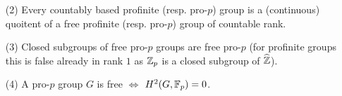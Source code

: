 \documentclass[12pt]{amsart}
\begin{document}
\begin{itemize}
\item[(2)] Every countably based profinite (resp. pro-$p$) group is a (continuous) quoitent of a free profinite (resp. pro-$p$) group
of countable rank.
\item[(3)] Closed subgroups of free pro-$p$ groups are free pro-$p$ (for profinite groups this is false already in rank $1$
as ${\mathbb Z}_p$ is a closed subgroup of $\widehat{{\mathbb Z}}$).
\item[(4)] A pro-$p$ group $G$ is free $\iff$ $H^2(G,{\mathbb F}_p)=0$.
\end{itemize}
\end{document}
